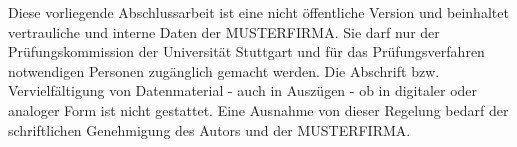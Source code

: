 

Diese vorliegende Abschlussarbeit ist eine nicht öffentliche Version und beinhaltet vertrauliche und interne Daten der MUSTERFIRMA. Sie darf nur der Prüfungskommission der Universität Stuttgart und für das Prüfungsverfahren notwendigen Personen zugänglich gemacht werden. Die Abschrift bzw. Vervielfältigung von Datenmaterial - auch in Auszügen - ob in digitaler oder analoger Form ist nicht gestattet. Eine Ausnahme von dieser Regelung bedarf der schriftlichen Genehmigung des Autors und der MUSTERFIRMA.